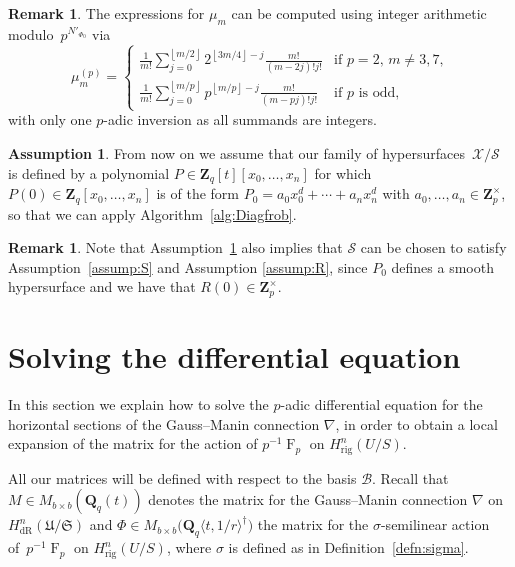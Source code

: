 \documentclass[a4paper,11pt]{article}
\numberwithin{equation}{section}
\providecommand{\floor}[1]{\left\lfloor#1\right\rfloor}   %
\newcommand{\ZZ}{\mathbf{Z}} %
\newcommand{\QQ}{\mathbf{Q}} %
\DeclareMathOperator{\Frob}{F}           %
\providecommand{\HdR}{H_{\text{dR}}}    %
\providecommand{\Hrig}{H_{\text{rig}}}  %
\providecommand{\cB}{\mathcal{B}} %
\theoremstyle{definition}
\newtheorem{rem}[thm]{Remark}
\newtheorem{assump}[thm]{Assumption}
\begin{document}
\begin{rem} \label{rem:mup}
The expressions for $\mu_m$ can be computed using integer arithmetic 
modulo~$p^{N'_{\Phi_0}}$ via 
\begin{equation*}
\mu_m^{(p)} = \begin{cases}
\frac{1}{m!} \sum_{j=0}^{\floor{m/2}} 2^{\floor{3m/4} - j} \frac{m!}{(m-2j)! j!}
    & \text{if $p = 2$, $m \neq 3, 7$,} \\
\frac{1}{m!} \sum_{j=0}^{\floor{m/p}} p^{\floor{m/p} - j} \frac{m!}{(m-pj)! j!}
    & \text{if $p$ is odd,}
\end{cases}
\end{equation*}
with only one $p$-adic inversion as all summands are integers. 
\end{rem}

\begin{assump} \label{assump:diag}
From now on we assume that our family of 
hypersurfaces~$\mathcal{X}/\mathcal{S}$ is defined by a 
polynomial $P \in \ZZ_q[t][x_0,\dotsc,x_n]$ for which 
$P(0) \in \ZZ_q[x_0,\dotsc,x_n]$ is of the form 
$P_0=a_0 x_0^d + \dotsb + a_n x_n^d$ with $a_0,\dotsc,a_n \in \ZZ_p^{\times}$, 
so that we can apply Algorithm~\ref{alg:Diagfrob}. 
\end{assump}

\begin{rem}
Note that Assumption~\ref{assump:diag} 
also implies that $\mathcal{S}$ can be chosen to satisfy Assumption~\ref{assump:S} 
and Assumption \ref{assump:R}, since $P_0$ defines a smooth hypersurface and 
we have that $R(0) \in \ZZ_p^{\times}$. 
\end{rem}


\section{Solving the differential equation}
\label{sec:DifferentialSystem}

In this section we explain how to solve the $p$-adic differential 
equation for the horizontal sections of the Gauss--Manin 
connection $\nabla$, in order to obtain a local expansion of the 
matrix for the action of $p^{-1} \Frob_p$ on $\Hrig^{n}(U/S)$.  

All our matrices will be defined with respect to the basis $\cB$. Recall 
that $M \in M_{b \times b}(\QQ_q(t))$ denotes 
the matrix for the Gauss--Manin connection $\nabla$ on 
$\HdR^n(\mathfrak{U}/\mathfrak{S})$ and 
$\Phi \in M_{b \times b} \bigl(\QQ_q \langle t,1/r \rangle^{\dag} \bigr)$ 
the matrix for the $\sigma$-semilinear action of~$p^{-1} \Frob_p$ 
on $\Hrig^{n}(U/S)$, where $\sigma$ is defined as 
in Definition~\ref{defn:sigma}.
\end{document}
